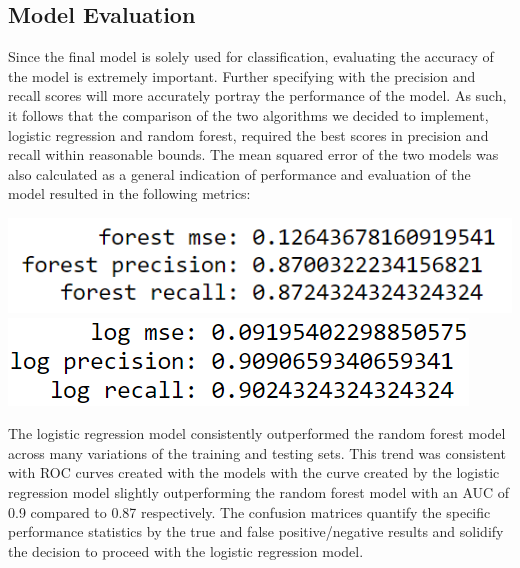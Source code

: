 \documentclass[12pt]{article}
\begin{document}
\subsection*{Model Evaluation}
Since the final model is solely used for classification, evaluating the accuracy of the model is extremely important. Further specifying with the precision and recall scores will more accurately portray the performance of the model. As such, it follows that the comparison of the two algorithms we decided to implement, logistic regression and random forest, required the best scores in precision and recall within reasonable bounds. The mean squared error of the two models was also calculated as a general indication of performance and evaluation of the model resulted in the following metrics:

\begin{center}
        \includegraphics[width=\textwidth, height=\textheight, keepaspectratio]{images/image3.png}
        \includegraphics[width=\textwidth, height=\textheight, keepaspectratio]{images/image4.png}
\end{center}

The logistic regression model consistently outperformed the random forest model across many variations of the training and testing sets. This trend was consistent with ROC curves created with the models with the curve created by the logistic regression model slightly outperforming the random forest model with an AUC of 0.9 compared to 0.87 respectively. The confusion matrices quantify the specific performance statistics by the true and false positive/negative results and solidify the decision to proceed with the logistic regression model.
\end{document}
